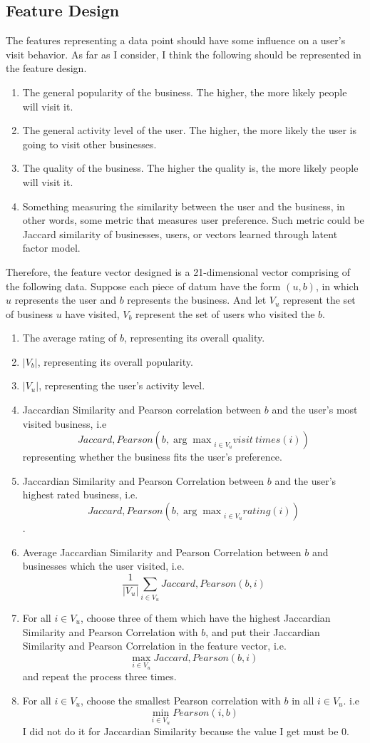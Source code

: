 \documentclass{article}
\begin{document}
\subsection{Feature Design}
The features representing a data point should have some influence on a user's visit behavior. As far as I consider, I think the following should be represented in the feature design. 
\begin{enumerate}
\item The general popularity of the business. The higher, the more likely people will visit it. 
\item The general activity level of the user. The higher, the more likely the user is going to visit other businesses. 
\item The quality of the business. The higher the quality is, the more likely people will visit it. 
\item Something measuring the similarity between the user and the business, in other words, some metric that measures user preference. Such metric could be Jaccard similarity of businesses, users, or vectors learned through latent factor model. 
\end{enumerate}
Therefore, the feature vector designed is a 21-dimensional vector comprising of the following data. Suppose each piece of datum have the form $(u,b)$, in which $u$ represents the user and $b$ represents the business. And let $V_u$ represent the set of business $u$ have visited, $V_b$ represent the set of users who visited the $b$.
\begin{enumerate}
\item The average rating of $b$, representing its overall quality. 
\item $|V_b|$, representing its overall popularity. 
\item $|V_u|$, representing the user's activity level. 
\item Jaccardian Similarity and Pearson correlation between $b$ and the user's most visited business, i.e$$Jaccard, Pearson(b, {\arg\max}_{i\in V_u}visit\ times(i))$$ representing whether the business fits the user's preference. 
\item Jaccardian Similarity and Pearson Correlation between $b$ and the user's highest rated business, i.e. $$Jaccard, Pearson(b, {\arg\max}_{i\in V_u}rating(i))$$. 
\item Average Jaccardian Similarity and Pearson Correlation between $b$ and businesses which the user visited, i.e. 
$$\frac{1}{|V_u|}\sum_{i\in V_u}Jaccard, Pearson(b, i) $$
\item For all $i\in V_u$, choose three of them which have the highest Jaccardian Similarity and Pearson Correlation with $b$, and put their Jaccardian Similarity and Pearson Correlation in the feature vector, i.e. 
$$\max_{i\in V_u}Jaccard, Pearson(b,i)$$
and repeat the process three times. 
\item For all $i\in V_u$, choose the smallest Pearson correlation with $b$ in all $i\in V_u$. i.e$$\min_{i\in V_u}Pearson(i, b)$$
I did not do it for Jaccardian Similarity because the value I get must be 0. 
\end{enumerate}
\end{document}
